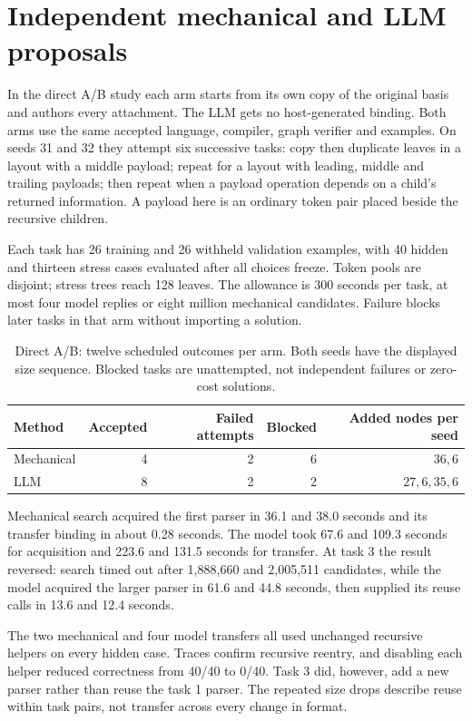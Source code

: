 \section{Independent mechanical and LLM proposals}
\label{sec:direct-ab}

In the direct A/B study each arm starts from its own copy of the original
basis and authors every attachment. The LLM gets no host-generated binding.
Both arms use the same accepted language, compiler, graph verifier and examples.
On seeds 31 and 32 they attempt six successive tasks: copy then duplicate leaves
in a layout with a middle payload; repeat for a layout with leading, middle
and trailing payloads; then repeat when a payload operation depends on a
child's returned information. A payload here is an ordinary token pair placed
beside the recursive children.

Each task has 26 training and 26 withheld validation examples, with 40 hidden
and thirteen stress cases evaluated after all choices freeze. Token pools are
disjoint; stress trees reach 128 leaves. The allowance is 300 seconds per task,
at most four model replies or eight million mechanical candidates. Failure
blocks later tasks in that arm without importing a solution.

\begin{table}[htbp]
\centering
\small
\begin{tabular}{lrrrr}
\toprule
Method & Accepted & Failed attempts & Blocked & Added nodes per seed \\
\midrule
Mechanical & 4 & 2 & 6 & $36,6$ \\
LLM & 8 & 2 & 2 & $27,6,35,6$ \\
\bottomrule
\end{tabular}
\caption{Direct A/B: twelve scheduled outcomes per arm. Both seeds have the
displayed size sequence. Blocked tasks are unattempted, not independent failures
or zero-cost solutions.}
\label{tab:direct-ab}
\end{table}

Mechanical search acquired the first parser in 36.1 and 38.0 seconds and its
transfer binding in about 0.28 seconds. The model took 67.6 and 109.3 seconds
for acquisition and 223.6 and 131.5 seconds for transfer. At task 3 the result
reversed: search timed out after 1,888,660 and 2,005,511 candidates, while the
model acquired the larger parser in 61.6 and 44.8 seconds, then supplied its
reuse calls in 13.6 and 12.4 seconds.

The two mechanical and four model transfers all used unchanged recursive
helpers on every hidden case. Traces confirm recursive reentry, and disabling
each helper reduced correctness from 40/40 to 0/40. Task 3 did, however, add
a new parser rather than reuse the task 1 parser. The repeated size drops
describe reuse within task pairs, not transfer across every change in format.

